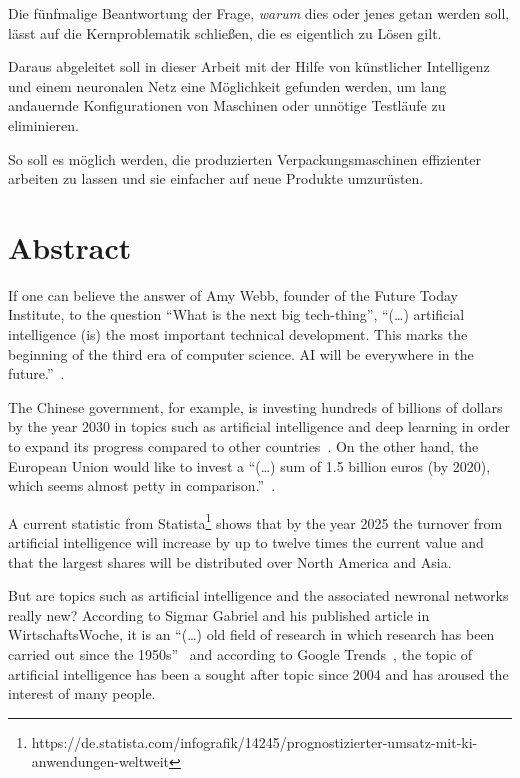 Die fünfmalige Beantwortung der Frage, \textit{warum} dies oder jenes getan werden soll, lässt auf die Kernproblematik
schließen, die es eigentlich zu Lösen gilt.

Daraus abgeleitet soll in dieser Arbeit mit der Hilfe von künstlicher Intelligenz und einem neuronalen Netz eine
Möglichkeit gefunden werden, um lang andauernde Konfigurationen von Maschinen oder unnötige Testläufe zu eliminieren.

So soll es möglich werden, die produzierten Verpackungsmaschinen effizienter arbeiten zu lassen und sie einfacher auf
neue Produkte umzurüsten.

\newpage

\section{Abstract}
\label{sec:abstract}
If one can believe the answer of Amy Webb, founder of the Future Today Institute, to the question \enquote{What is the
next big tech-thing}, \enquote{(\ldots) artificial intelligence (is) the most important technical development. This
marks the beginning of the third era of computer science. AI will be everywhere in the
future.}~\cite{article_einleitung_dub_aw}.

The Chinese government, for example, is investing hundreds of billions of dollars by the year 2030 in topics such as
artificial intelligence and deep learning in order to expand its progress compared to other
countries~\cite{article_einleitung_css}. On the other hand, the European Union would like to invest a \enquote{(\ldots)
sum of 1.5 billion euros (by 2020), which seems almost petty in comparison.}~\cite{article_einleitung_ww_sg}.

A current statistic from
Statista\footnote{https://de.statista.com/infografik/14245/prognostizierter-umsatz-mit-ki-anwendungen-weltweit} shows
that by the year 2025 the turnover from artificial intelligence will increase by up to twelve times the current value
and that the largest shares will be distributed over North America and Asia.

But are topics such as artificial intelligence and the associated newronal networks really new? According to Sigmar
Gabriel and his published article in WirtschaftsWoche, it is an \enquote{(\ldots) old field of research in which
research has been carried out since the 1950s}~\cite{article_einleitung_ww_sg} and according to Google
Trends~\cite{online_einleitung_googletrends}, the topic of artificial intelligence has been a sought after topic since
2004 and has aroused the interest of many people.

